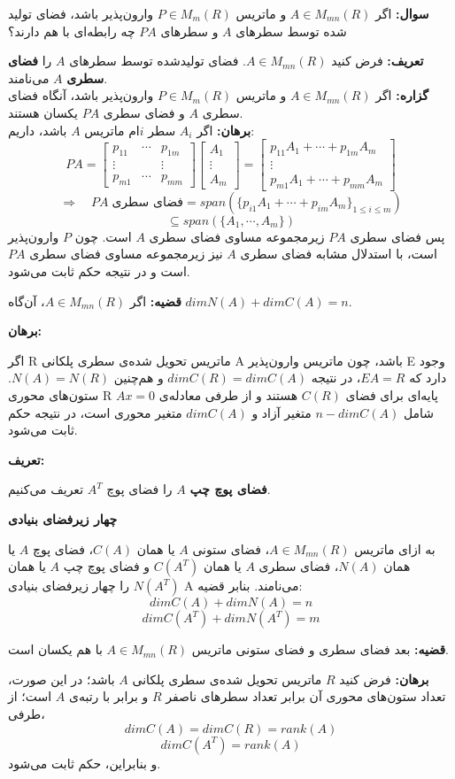 \textbf{سوال:}
اگر $A\in M_{mn}(R)$ و ماتریس $P\in M_m(R)$ وارون‌پذیر باشد، فضای تولید شده توسط سطرهای $A$ و سطرهای $PA$ چه رابطه‌ای با هم دارند؟

\textbf{تعریف:}
فرض کنید $A\in M_{mn}(R)$. فضا‌ی تولید‌شده توسط سطر‌های $A$ را \textbf{فضای سطری} $A$ می‌نامند.\\
\textbf{گزاره:}
اگر $A\in M_{mn}(R)$ و ماتریس $P\in M_m(R)$ وارون‌پذیر باشد، آنگاه فضا‌ی سطری $A$ و فضا‌ی سطری $PA$ یکسان هستند.\\
\textbf{برهان:}
اگر $A_i$ سطر $i$ام ماتریس $A$ باشد، داریم:
$$PA= \begin{bmatrix}
p_{11}&\cdots&p_{1m}\\
\vdots&&\vdots\\
p_{m1}&\cdots&p_{mm}
\end{bmatrix}\begin{bmatrix}
A_1\\
\vdots\\
A_m
\end{bmatrix} = \begin{bmatrix}
p_{11}A_1+\cdots+p_{1m}A_m\\
\vdots\\
p_{m1}A_1+\cdots+p_{mm}A_m
\end{bmatrix}$$
$$\Rightarrow \quad PA\;\text{فضا‌ی سطری}= span(\{p_{i1}A_1+\cdots+p_{im}A_m\}_{1\leq i\leq m})$$
$$\subseteq span (\{A_1,\cdots,A_m\})$$
پس فضا‌ی سطری $PA$ زیر‌مجموعه مساوی فضا‌ی سطری $A$ است. چون $P$ وارون‌پذیر است، با استدلال مشابه فضا‌ی سطری $A$ نیز زیرمجموعه مساوی فضا‌ی سطری $PA$ است و در نتیجه حکم ثابت می‌شود.

\textbf{قضیه:}
اگر $A \in M_{mn}(R)$، آن‌گاه $dim N(A) + dim C(A) = n$.

\textbf{برهان:}

اگر R ماتریس تحویل شده‌ی سطری پلکانی A باشد، چون ماتریس وارون‌پذیر E وجود دارد که $EA = R$، در نتیجه $dimC(R) = dimC(A)$ و هم‌چنین $N(A) = N(R)$. ستون‌های محوری R پایه‌ای برای فضای $C(R)$ هستند و از طرفی معادله‌ی $Ax=0$ شامل $n-dimC(A)$ متغیر آزاد و $dimC(A)$ متغیر محوری است، در نتیجه حکم ثابت می‌شود.

\textbf{تعریف:}

 \textbf{فضای پوچ چپ} $A$ را فضای پوچ $A^T$ تعریف می‌کنیم.

\textbf{چهار زیرفضای بنیادی}

به ازای ماتریس $A \in M_{mn}(R)$، فضای ستونی $A$ یا همان $C(A)$، فضای پوچ $A$ یا همان $N(A)$، فضای سطری $A$ یا همان $C(A^T)$ و فضای پوچ چپ $A$ یا همان $N(A^T)$ را چهار زیرفضای بنیادی A می‌نامند. بنابر قضیه:
$$ dim C(A) + dim N(A) = n $$
$$ dim C(A^T) + dim N(A^T) = m $$

\textbf{قضیه:}
بعد فضای سطری و فضای ستونی ماتریس $A \in M_{mn}(R)$ با هم یکسان است.

\textbf{برهان:}
فرض کنید $R$ ماتریس تحویل شده‌ی سطری پلکانی $A$ باشد؛ در این صورت، تعداد ستون‌های محوری آن برابر تعداد سطرهای ناصفر $R$ و برابر با رتبه‌ی $A$ است؛ از طرفی،
$$ dimC(A) = dimC(R) = rank(A) $$
$$ dim C(A^T) = rank(A) $$
و بنابراین، حکم ثابت می‌شود.







